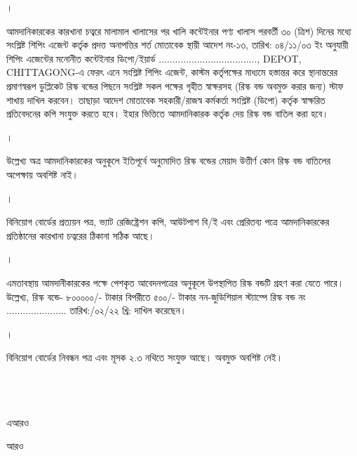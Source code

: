 \documentclass[12pt]{article}
\newcommand{\rdepo}{...................................., DEPOT, CHITTAGONG}
\newcommand{\riskbonddate}{\hspace{2em}/০২/২২ খ্রি:}
\newcommand{\riskbondno}{......................}
\newcommand{\riskbondt}{৮০০০০০/-}
\newcommand{\riskbondg}{৫০০/-}
\begin{document}
\begin{minipage}[t]{0.04\linewidth}
।
\end{minipage}
\begin{minipage}[t]{0.96\linewidth}
আমদানিকারকের কারখানা চত্বরে মালামাল
খালাসের পর খালি কন্টেইনার পণ্য খালাস পরবর্তী
৩০ (ত্রিশ) দিনের মধ্যে
সংশ্লিষ্ট শিপিং এজেন্ট কর্তৃক প্রদত্ত
অনাপত্তির শর্ত মোতাবেক
স্থায়ী আদেশ নং-১৩,
তারিখ: ০৪/১১/০৩ ইং
অনুযায়ী শিপিং এজেন্টের মনোনীত
কন্টেইনার ডিপো/ইয়ার্ড {\rdepo}-এ
ফেরৎ এনে সংশ্লিষ্ট শিপিং এজেন্ট,
কাস্টম কর্তৃপক্ষের মাধ্যমে হস্তান্তর করে
স্থানান্তরের প্রমাণস্বরূপ ডুপ্লিকেট রিস্ক বন্ডের পিছনে
সংশ্লিষ্ট সকল পক্ষের গৃহীত স্বাক্ষরসহ
(রিস্ক বন্ড অবমুক্ত করার জন্য)
স্টাফ শাখায় দাখিল করবেন।
তাছাড়া আদেশ মোতাবেক
সহকারী/রাজস্ব কর্মকর্তা সংশ্লিষ্ট (ডিপো) কর্তৃক
স্বাক্ষরিত প্রতিবেদনের কপি সংযুক্ত করতে হবে।
ইহার ভিত্তিতে আমদানিকারক কর্তৃক দেয়
রিস্ক বন্ড বাতিল করা হবে।
\\
\end{minipage}
\begin{minipage}[t]{0.04\linewidth}
।
\end{minipage}
\begin{minipage}[t]{0.96\linewidth}
উল্লেখ্য অত্র আমদানিকারকের অনুকূলে ইতিপূর্বে
অনুমোদিত রিস্ক বন্ডের মেয়াদ উত্তীর্ণ কোন
রিস্ক বন্ড বাতিলের অপেক্ষায় অবশিষ্ট নাই।
\\
\end{minipage}
\begin{minipage}[t]{0.04\linewidth}
।
\end{minipage}
\begin{minipage}[t]{0.96\linewidth}
বিনিয়োগ বোর্ডের প্রত্যয়ন পত্র,
ভ্যাট রেজিষ্ট্রেশন কপি,
আউটপাশ বি/ই এবং প্রেরিতব্য পত্রে
আমদানিকারকের প্রতিষ্ঠানের কারখানা চত্বরের
ঠিকানা সঠিক আছে।
\\
\end{minipage}
\begin{minipage}[t]{0.04\linewidth}
।
\end{minipage}
\begin{minipage}[t]{0.96\linewidth}
এমতাবস্থায় আমদানীকারকের পক্ষে
পেশকৃত আবেদনপত্রের অনুকূলে
উপস্থাপিত রিস্ক বন্ডটি গ্রহণ করা যেতে পারে।
উল্লেখ্য, রিস্ক বন্ডে-
{\riskbondt}
টাকার বিপরীতে
{\riskbondg}
টাকার নন-জুডিশিয়াল
স্ট্যাম্পে রিস্ক বন্ড নং {\riskbondno}
{তারিখ:\riskbonddate} দাখিল করেছেন।
\\
\end{minipage}
\begin{minipage}[t]{0.04\linewidth}
।
\end{minipage}
\begin{minipage}[t]{0.96\linewidth}
বিনিয়োগ বোর্ডের নিবন্ধন পত্র এবং
মূসক ২.৩ নথিতে সংযুক্ত আছে।
অবমুক্ত অবশিষ্ট নেই।
\\
\\
\\
\\
\end{minipage}
\normalsize
\begin{minipage}[t]{0.6\linewidth}
\hspace{1em}
\end{minipage}
\begin{minipage}[t]{0.2\linewidth}
এআরও
\end{minipage}
\begin{minipage}[t]{0.2\linewidth}
আরও
\end{minipage}
\thispagestyle{laststyle}
\end{document}
